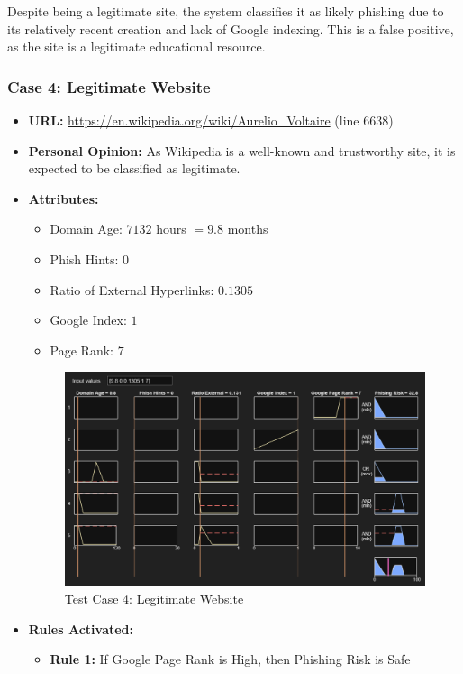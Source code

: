 \documentclass[11pt]{article}
\begin{document}
Despite being a legitimate site, the system classifies it as likely phishing due to its relatively recent creation and lack of Google indexing. This is a false positive, as the site is a legitimate educational resource. 

\subsubsection{Case 4: Legitimate Website}

\begin{itemize}
    \item \textbf{URL:} \url{https://en.wikipedia.org/wiki/Aurelio_Voltaire} (line 6638)
    \item \textbf{Personal Opinion:} As Wikipedia is a well-known and trustworthy site, it is expected to be classified as legitimate.
    \item \textbf{Attributes:}
    \begin{itemize}
        \item Domain Age: $7132$ hours $= 9.8$ months
        \item Phish Hints: $0$
        \item Ratio of External Hyperlinks: $0.1305$
        \item Google Index: $1$
        \item Page Rank: $7$
    \end{itemize}
    \begin{figure}[h!]
        \centering
        \includegraphics[width=\textwidth]{test-4.png}
        \caption{Test Case 4: Legitimate Website}
    \end{figure}
    \item \textbf{Rules Activated:} 
    \begin{itemize}
        \item \textbf{Rule 1:} If Google Page Rank is High, then Phishing Risk is Safe

\end{itemize}
\end{itemize}
\end{document}
